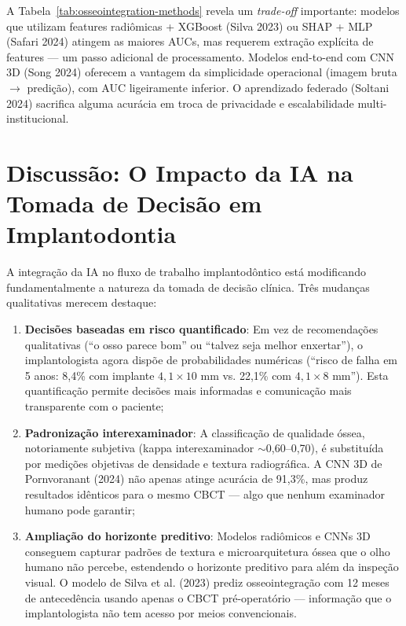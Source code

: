 A Tabela~\ref{tab:osseointegration-methods} revela um \textit{trade-off} importante: modelos que utilizam features radiômicas + XGBoost (Silva 2023) ou SHAP + MLP (Safari 2024) atingem as maiores AUCs, mas requerem extração explícita de features --- um passo adicional de processamento. Modelos end-to-end com CNN 3D (Song 2024) oferecem a vantagem da simplicidade operacional (imagem bruta $\rightarrow$ predição), com AUC ligeiramente inferior. O aprendizado federado (Soltani 2024) sacrifica alguma acurácia em troca de privacidade e escalabilidade multi-institucional.

\section{Discussão: O Impacto da IA na Tomada de Decisão em Implantodontia}

A integração da IA no fluxo de trabalho implantodôntico está modificando fundamentalmente a natureza da tomada de decisão clínica. Três mudanças qualitativas merecem destaque:

\begin{enumerate}
    \item \textbf{Decisões baseadas em risco quantificado}: Em vez de recomendações qualitativas (``o osso parece bom'' ou ``talvez seja melhor enxertar''), o implantologista agora dispõe de probabilidades numéricas (``risco de falha em 5 anos: 8,4\% com implante $4,1 \times 10$ mm vs. 22,1\% com $4,1 \times 8$ mm''). Esta quantificação permite decisões mais informadas e comunicação mais transparente com o paciente;

    \item \textbf{Padronização interexaminador}: A classificação de qualidade óssea, notoriamente subjetiva (kappa interexaminador $\sim$0,60--0,70), é substituída por medições objetivas de densidade e textura radiográfica. A CNN 3D de Pornvoranant (2024) não apenas atinge acurácia de 91,3\%, mas produz resultados idênticos para o mesmo CBCT --- algo que nenhum examinador humano pode garantir;

    \item \textbf{Ampliação do horizonte preditivo}: Modelos radiômicos e CNNs 3D conseguem capturar padrões de textura e microarquitetura óssea que o olho humano não percebe, estendendo o horizonte preditivo para além da inspeção visual. O modelo de Silva et al. (2023) prediz osseointegração com 12 meses de antecedência usando apenas o CBCT pré-operatório --- informação que o implantologista não tem acesso por meios convencionais.
\end{enumerate}

